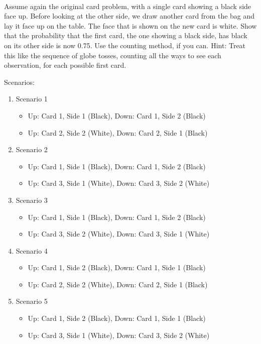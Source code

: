 \documentclass[12pt]{article}\usepackage[]{graphicx}\usepackage[]{color}
\newenvironment{problem}[2][Problem]{\begin{trivlist}
\item[\hskip \labelsep {\bfseries #1}\hskip \labelsep {\bfseries #2.}]}{\end{trivlist}}
\begin{document}
\begin{problem}{2M7}
\text{}\\
Assume again the original card problem, with a single card showing a black side face up. Before looking at the other side, we draw another card from the bag and lay it face up on the table. The face that is shown on the new card is white. Show that the probability that the first card, the one showing a black side, has black on its other side is now 0.75. Use the counting method, if you can. Hint: Treat this like the sequence of globe tosses, counting all the ways to see each observation, for each possible first card.
\end{problem}

Scenarios:
\begin{enumerate}
  \item Scenario 1
  \begin{itemize}
    \item Up: Card 1, Side 1 (Black), Down: Card 1, Side 2 (Black)
    \item Up: Card 2, Side 2 (White), Down: Card 2, Side 1 (Black)
  \end{itemize}
  \item Scenario 2
  \begin{itemize}
    \item Up: Card 1, Side 1 (Black), Down: Card 1, Side 2 (Black)
    \item Up: Card 3, Side 1 (White), Down: Card 3, Side 2 (White)
  \end{itemize}
  \item Scenario 3
  \begin{itemize}
    \item Up: Card 1, Side 1 (Black), Down: Card 1, Side 2 (Black)
    \item Up: Card 3, Side 2 (White), Down: Card 3, Side 1 (White)
  \end{itemize}
  \item Scenario 4
  \begin{itemize}
    \item Up: Card 1, Side 2 (Black), Down: Card 1, Side 1 (Black)
    \item Up: Card 2, Side 2 (White), Down: Card 2, Side 1 (Black)
  \end{itemize}
  \item Scenario 5
  \begin{itemize}
    \item Up: Card 1, Side 2 (Black), Down: Card 1, Side 1 (Black)
    \item Up: Card 3, Side 1 (White), Down: Card 3, Side 2 (White)

\end{itemize}
\end{enumerate}
\end{document}
